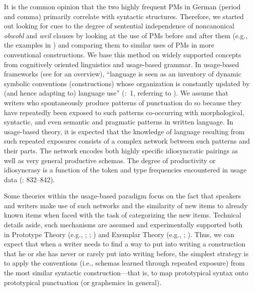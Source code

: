 It is the common opinion that the two highly frequent PMs in German (period and comma) primarily correlate with syntactic structures. Therefore, we started out looking for cues to the degree of sentential independence of noncanonical \textit{obwohl} and \textit{weil} clauses by looking at the use of PMs before and after them (e.g., the examples in ) and comparing them to similar uses of PMs in more conventional constructions. We base this method on widely supported concepts from cognitively oriented linguistics and usage-based grammar. In usage-based frameworks (see \citealt{BybeeBeckner2009} for an overview), “language is seen as an inventory of dynamic symbolic conventions (constructions) whose organization is constantly updated by (and hence adapting to) language use” (\citealt{Zeschel2008}:~1, referring to \citealt{Langacker2000}). We assume that writers who spontaneously produce patterns of punctuation do so because they have repeatedly been exposed to such patterns co-occurring with morphological, syntactic, and even semantic and pragmatic patterns in written language. In usage-based theory, it is expected that the knowledge of language resulting from such repeated exposures consists of a complex network between such patterns and their parts. The network encodes both highly specific idiosyncratic pairings as well as very general productive schemas. The degree of productivity or idiosyncrasy is a function of the token and type frequencies encountered in usage data (\citealt{BybeeBeckner2009}: 832–842).



Some theories within the usage-based paradigm focus on the fact that speakers and writers make use of such networks and the similarity of new items to already known items when faced with the task of categorizing the new items. Technical details aside, such mechanisms are assumed and experimentally supported both in Prototype Theory (e.g., \citealt{Rosch1973}; \citealt{RoschEtAl1976}; \citealt{Rosch1978}) and Exemplar Theory (e.g., \citealt{MedinSchaffer1978}; \citealt{Hintzman1986}). Thus, we can expect that when a writer needs to find a way to put into writing a construction that he or she has never or rarely put into writing before, the simplest strategy is to apply the conventions (i.e., schemas learned through repeated exposure) from the most similar syntactic construction—that is, to map prototypical syntax onto prototypical punctuation (or graphemics in general).



